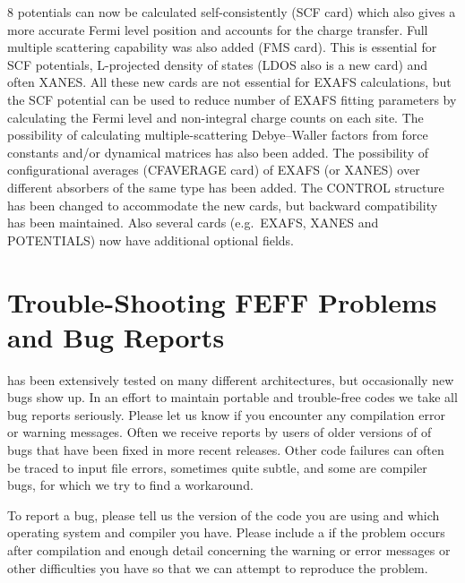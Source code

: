\documentclass[11pt,oneside]{report} %
\begin{document}
{{\feff}8 potentials can now be calculated self-consistently (SCF
card) which also gives a more accurate Fermi level position and
accounts for the charge transfer.  Full multiple scattering capability
was also added (FMS card).  This is essential for SCF potentials,
L-projected density of states (LDOS also is a new card) and often
XANES. All these new cards are not essential for EXAFS calculations,
but the SCF potential can be used to reduce number of EXAFS fitting
parameters by calculating the Fermi level and non-integral charge
counts on each site.  The possibility of calculating
multiple-scattering Debye--Waller factors from force constants and/or
dynamical matrices has also been added.  The possibility of
configurational averages (CFAVERAGE card) of EXAFS (or XANES) over
different absorbers of the same type has been added.  The CONTROL
structure has been changed to accommodate the new cards, but backward
compatibility has been maintained.  Also several cards (e.g.\ EXAFS,
XANES and POTENTIALS) now have additional optional fields.

\chapter{Trouble-Shooting FEFF Problems and Bug Reports}
\label{sec:Appendix-F.-Trouble}

{\feffcur} has been extensively tested on many different architectures,
but occasionally new bugs show up.  In an effort to maintain portable
and trouble-free codes we take all bug reports seriously.  Please
let us know if you encounter any compilation error  or warning messages.
Often we receive reports by users of older
versions of {\feff} of bugs that have been fixed in more recent
releases. Other code failures can often be traced to input file
errors, sometimes quite subtle, and some are compiler bugs, for which
we try to find a workaround.

To  report a bug, please tell us the version of the code you are using
and which operating system and compiler you have. Please include a
 if the problem occurs after compilation
and enough detail concerning the warning or error messages or
other difficulties you have so that we can attempt to reproduce the problem.

}
\end{document}
